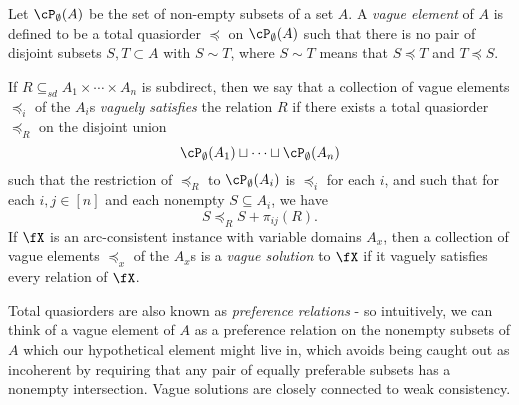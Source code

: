 \begin{defn} Let $\cP_\emptyset(A)$ be the set of non-empty subsets of a set $A$. A \emph{vague element} of $A$ is defined to be a total quasiorder $\preceq$ on $\cP_\emptyset(A)$ such that there is no pair of disjoint subsets $S, T \subset A$ with $S \sim T$, where $S \sim T$ means that $S \preceq T$ and $T \preceq S$.

If $R \subseteq_{sd} A_1 \times \cdots \times A_n$ is subdirect, then we say that a collection of vague elements $\preceq_i$ of the $A_i$s \emph{vaguely satisfies} the relation $R$ if there exists a total quasiorder $\preceq_R$ on the disjoint union
\[
\cP_\emptyset(A_1) \sqcup \cdots \sqcup \cP_\emptyset(A_n)
\]
such that the restriction of $\preceq_R$ to $\cP_\emptyset(A_i)$ is $\preceq_i$ for each $i$, and such that for each $i,j \in [n]$ and each nonempty $S \subseteq A_i$, we have
\[
S \preceq_R S+\pi_{ij}(R).
\]
If $\fX$ is an arc-consistent instance with variable domains $A_x$, then a collection of vague elements $\preceq_x$ of the $A_x$s is a \emph{vague solution} to $\fX$ if it vaguely satisfies every relation of $\fX$.
\end{defn}

Total quasiorders are also known as \emph{preference relations} - so intuitively, we can think of a vague element of $A$ as a preference relation on the nonempty subsets of $A$ which our hypothetical element might live in, which avoids being caught out as incoherent by requiring that any pair of equally preferable subsets has a nonempty intersection. Vague solutions are closely connected to weak consistency.

